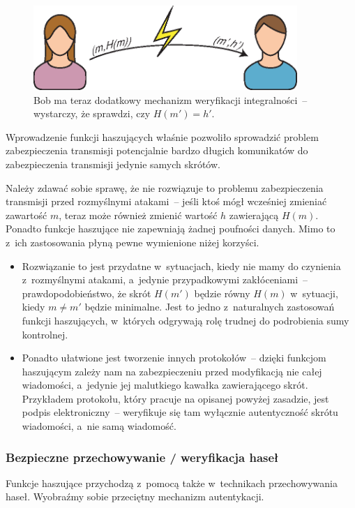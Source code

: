\documentclass[12pt,a4paper,twoside]{article}
\begin{document}
\begin{figure}[htb!]
    \includegraphics[width=10cm]{img/usage1b.eps}
    \caption{Bob ma teraz dodatkowy mechanizm weryfikacji integralności~--
    wystarczy, że sprawdzi, czy $H(m')=h'$.}
    \label{fig:usage_integrity_check_2}
\end{figure}

Wprowadzenie funkcji haszujących właśnie pozwoliło sprowadzić problem
zabezpieczenia transmisji potencjalnie bardzo długich komunikatów do
zabezpieczenia transmisji jedynie samych skrótów.

Należy zdawać sobie sprawę, że nie rozwiązuje to problemu zabezpieczenia
transmisji przed rozmyślnymi atakami~-- jeśli ktoś mógł wcześniej zmieniać
zawartość $m$, teraz może również zmienić wartość $h$ zawierającą $H(m)$.
Ponadto funkcje haszujące nie zapewniają żadnej poufności danych. Mimo to z~ich
zastosowania płyną pewne wymienione niżej korzyści.

\begin{itemize}

    \item Rozwiązanie to jest przydatne w~sytuacjach, kiedy nie mamy do
    czynienia z~rozmyślnymi atakami, a~jedynie przypadkowymi zakłóceniami~--
    prawdopodobieństwo, że skrót $H(m')$ będzie równy $H(m)$ w~sytuacji, kiedy
    $m \neq m'$ będzie minimalne. Jest to jedno z~naturalnych zastosowań
    funkcji haszujących, w~których odgrywają rolę trudnej do podrobienia sumy
    kontrolnej.

    \item Ponadto ułatwione jest tworzenie innych protokołów~-- dzięki funkcjom
    haszującym zależy nam na zabezpieczeniu przed modyfikacją nie całej
    wiadomości, a~jedynie jej malutkiego kawałka zawierającego skrót.
    Przykładem protokołu, który pracuje na opisanej powyżej zasadzie, jest
    podpis elektroniczny~--  weryfikuje się tam wyłącznie
    autentyczność skrótu wiadomości, a~nie samą wiadomość.

\end{itemize}



\subsubsection{Bezpieczne przechowywanie / weryfikacja haseł}
\label{sec:usage_password_check}
Funkcje haszujące przychodzą z~pomocą także w~technikach przechowywania haseł.
Wyobraźmy sobie przeciętny mechanizm autentykacji.
\end{document}

